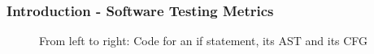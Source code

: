 \begin{frame}
\frametitle{Introduction - Software Testing Metrics}
\begin{figure}
\centering
\begin{minipage}{.3\textwidth}
  \centering
  
\end{minipage}%
\begin{minipage}{.3\textwidth}
  \centering
\end{minipage}
\begin{minipage}{.3\textwidth}
  \centering
\end{minipage}
\caption{From left to right: Code for an if statement, its AST and its CFG}
\end{figure}

\end{frame}
